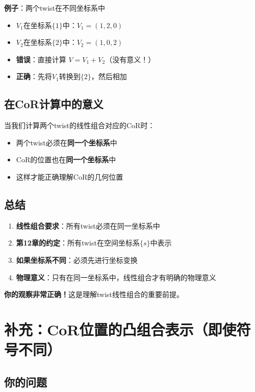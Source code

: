 \documentclass[12pt,a4paper]{article}
\begin{document}
\textbf{例子}：两个twist在不同坐标系中

\begin{itemize}
\item $V_1$在坐标系$\{1\}$中：$V_1 = (1, 2, 0)$
\item $V_2$在坐标系$\{2\}$中：$V_2 = (1, 0, 2)$
\item \textbf{错误}：直接计算 $V = V_1 + V_2$（没有意义！）
\item \textbf{正确}：先将$V_1$转换到$\{2\}$，然后相加
\end{itemize}

\subsection{在CoR计算中的意义}

当我们计算两个twist的线性组合对应的CoR时：

\begin{itemize}
\item 两个twist必须在\textbf{同一个坐标系}中
\item CoR的位置也在\textbf{同一个坐标系}中
\item 这样才能正确理解CoR的几何位置
\end{itemize}

\subsection{总结}

\begin{enumerate}
\item \textbf{线性组合要求}：所有twist必须在同一坐标系中

\item \textbf{第12章的约定}：所有twist在空间坐标系$\{s\}$中表示

\item \textbf{如果坐标系不同}：必须先进行坐标变换

\item \textbf{物理意义}：只有在同一坐标系中，线性组合才有明确的物理意义
\end{enumerate}

\textbf{你的观察非常正确！}这是理解twist线性组合的重要前提。

\section{补充：CoR位置的凸组合表示（即使符号不同）}

\subsection{你的问题}
\end{document}
